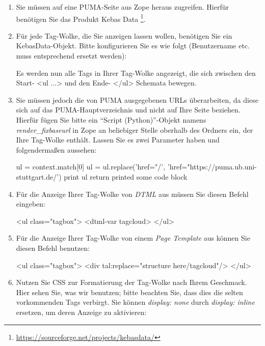 \documentclass[a4paper,11pt,twoside]{scrbook}
\begin{document}
\begin{enumerate}
    \item Sie müssen auf eine PUMA-Seite aus Zope heraus zugreifen. Hierfür benötigen Sie das Produkt Kebas Data \footnote{\url{https://sourceforge.net/projects/kebasdata/}}.
    \item Für jede Tag-Wolke, die Sie anzeigen lassen wollen, benötigen Sie ein KebasData-Objekt. Bitte konfigurieren Sie es wie folgt (Benutzername etc. muss entsprechend ersetzt werden):%

    Es werden nun alle Tags in Ihrer Tag-Wolke angezeigt, die sich zwischen den Start- <ul ...> und den Ende- </ul> Schemata bewegen.
    \item Sie müssen jedoch die von PUMA ausgegebenen URLs überarbeiten, da diese sich auf das PUMA-Hauptverzeichnis und nicht auf Ihre Seite beziehen. Hierfür fügen Sie bitte ein \enquote{Script (Python)}-Objekt namens \textit{render\_fixbaseurl} in Zope an beliebiger Stelle oberhalb des Ordners ein, der Ihre Tag-Wolke enthält. Lassen Sie es zwei Parameter haben und folgendermaßen aussehen: 

    ul = context.match[0]\newline
    ul = ul.replace('href="/', 'href="https://puma.ub.uni-stuttgart.de/')\newline
    print ul\newline
    return printed\newline
    some code block

    \item Für die Anzeige Ihrer Tag-Wolke von \textit{DTML} aus müssen Sie diesen Befehl eingeben: 

    <ul class="tagbox">\newline
        <dtml-var tagcloud>\newline
    </ul> \newline

    \item Für die Anzeige Ihrer Tag-Wolke von einem \textit{Page Template} aus können Sie diesen Befehl benutzen: 

    <ul class="tagbox">\newline
        <div tal:replace="structure here/tagcloud"/>\newline
    </ul>\newline

    \item Nutzen Sie CSS zur Formatierung der Tag-Wolke nach Ihrem Geschmack. Hier sehen Sie, was wir benutzen; bitte beachten Sie, dass dies die selten vorkommenden Tags verbirgt. Sie können \textit{display: none} durch \textit{display: inline} ersetzen, um deren Anzeige zu aktivieren: 


\end{enumerate}
\end{document}
